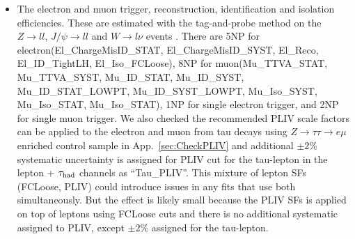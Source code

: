 \begin{itemize}
\item The electron and muon trigger, reconstruction, identification and isolation efficiencies. These are estimated with the tag-and-probe method on the $Z\to ll$, $J/\psi\to ll$ and $W\to l\nu$ events \cite{lep_sys}. There are 5NP for electron(El\_ChargeMisID\_STAT, El\_ChargeMisID\_SYST, El\_Reco, El\_ID\_TightLH, El\_Iso\_FCLoose), 8NP for muon(Mu\_TTVA\_STAT, Mu\_TTVA\_SYST, Mu\_ID\_STAT, Mu\_ID\_SYST, Mu\_ID\_STAT\_LOWPT, Mu\_ID\_SYST\_LOWPT, Mu\_Iso\_SYST, Mu\_Iso\_STAT, Mu\_Iso\_STAT), 1NP for single electron trigger, and 2NP for single muon trigger. 
  We also checked the recommended PLIV scale factors can be applied to the electron and muon from
  tau decays using $Z\rightarrow \tau\tau\rightarrow e\mu$ enriched control sample in App.~\ref{sec:CheckPLIV} and
  additional $\pm 2\%$ systematic uncertainty is assigned for PLIV cut for the tau-lepton in the lepton + $\tau_\text{had}$ channels as ``Tau\_PLIV''.
  This mixture of lepton SFs (FCLoose, PLIV) could introduce issues in any fits that use both simultaneously. But the effect is likely small
  because the PLIV SFs is applied on top of leptons using FCLoose cuts and there is no additional systematic assigned to PLIV,
  except $\pm 2\%$ assigned for the tau-lepton.
  

\end{itemize}
